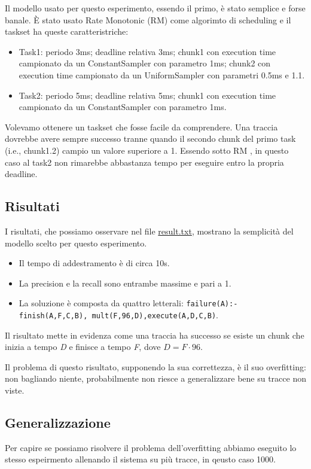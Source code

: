 \myskip

Il modello usato per questo esperimento, essendo il primo, è stato semplice e forse banale. È stato usato Rate Monotonic (RM) come algorimto di scheduling e il taskset ha queste caratteristriche:
\begin{itemize}
    \item Task1: periodo 3ms; deadline relativa 3ms; chunk1 con execution time campionato da un ConstantSampler con parametro 1ms; chunk2 con execution time campionato da un UniformSampler con parametri 0.5ms e 1.1.
    \item Task2: periodo 5ms; deadline relativa 5ms; chunk1 con execution time campionato da un ConstantSampler con parametro 1ms.
\end{itemize}

Volevamo ottenere un taskset che fosse facile da comprendere. Una traccia dovrebbe avere sempre successo tranne quando il secondo chunk del primo task (i.e., chunk1.2) campio un valore superiore a 1. Essendo sotto RM , in questo caso al task2 non rimarebbe abbastanza tempo per eseguire entro la propria deadline.

\subsection{Risultati}
I risultati, che possiamo osservare nel file \href{https://github.com/edoardosarri24/numsynth/tree/main/my-experiments/1-start/result.txt}{result.txt}, mostrano la semplicità del modello scelto per questo esperimento.
\begin{itemize}
    \item Il tempo di addestramento è di circa 10s.
    \item La precision e la recall sono entrambe massime e pari a 1.
    \item La soluzione è composta da quattro letterali: \texttt{failure(A):- finish(A,F,C,B), \allowbreak mult(F,96,D),execute(A,D,C,B)}.
\end{itemize}

\myskip

Il risultato mette in evidenza come una traccia ha successo se esiste un chunk che inizia a tempo \textit{D} e finisce a tempo \textit{F}, dove $D=F\cdot96$.

Il problema di questo risultato, supponendo la sua correttezza, è il suo overfitting: non bagliando niente, probabilmente non riesce a generalizzare bene su tracce non viste.

\subsection{Generalizzazione}
Per capire se possiamo risolvere il problema dell'overfitting abbiamo eseguito lo stesso espeirmento allenando il sistema su più tracce, in qeusto caso 1000.

